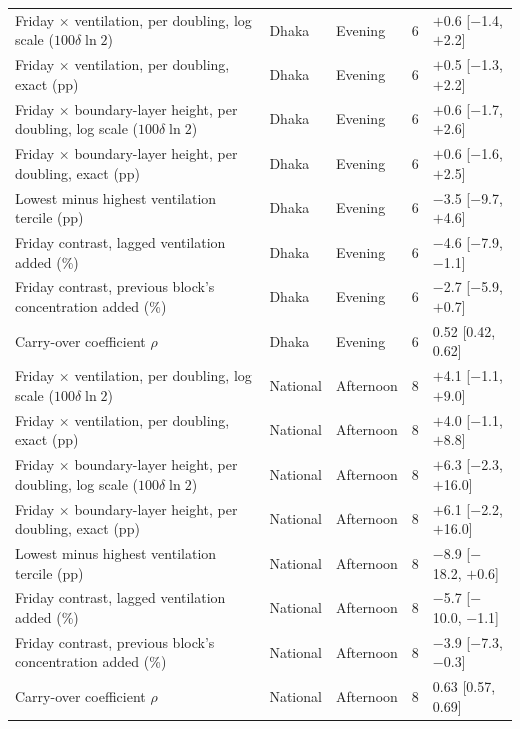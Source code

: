 \begin{longtable}{L{7.0cm} L{1.4cm} L{1.6cm} C{0.6cm} C{3.2cm}}
Friday $\times$ ventilation, per doubling, log scale ($100\delta\ln 2$) & Dhaka & Evening & 6 & $+$0.6 {\scriptsize[$-$1.4, $+$2.2]} \\
Friday $\times$ ventilation, per doubling, exact (pp) & Dhaka & Evening & 6 & $+$0.5 {\scriptsize[$-$1.3, $+$2.2]} \\
Friday $\times$ boundary-layer height, per doubling, log scale ($100\delta\ln 2$) & Dhaka & Evening & 6 & $+$0.6 {\scriptsize[$-$1.7, $+$2.6]} \\
Friday $\times$ boundary-layer height, per doubling, exact (pp) & Dhaka & Evening & 6 & $+$0.6 {\scriptsize[$-$1.6, $+$2.5]} \\
Lowest minus highest ventilation tercile (pp) & Dhaka & Evening & 6 & $-$3.5 {\scriptsize[$-$9.7, $+$4.6]} \\
Friday contrast, lagged ventilation added (\%) & Dhaka & Evening & 6 & $-$4.6 {\scriptsize[$-$7.9, $-$1.1]} \\
Friday contrast, previous block's concentration added (\%) & Dhaka & Evening & 6 & $-$2.7 {\scriptsize[$-$5.9, $+$0.7]} \\
Carry-over coefficient $\rho$ & Dhaka & Evening & 6 & 0.52 {\scriptsize[0.42, 0.62]} \\
Friday $\times$ ventilation, per doubling, log scale ($100\delta\ln 2$) & National & Afternoon & 8 & $+$4.1 {\scriptsize[$-$1.1, $+$9.0]} \\
Friday $\times$ ventilation, per doubling, exact (pp) & National & Afternoon & 8 & $+$4.0 {\scriptsize[$-$1.1, $+$8.8]} \\
Friday $\times$ boundary-layer height, per doubling, log scale ($100\delta\ln 2$) & National & Afternoon & 8 & $+$6.3 {\scriptsize[$-$2.3, $+$16.0]} \\
Friday $\times$ boundary-layer height, per doubling, exact (pp) & National & Afternoon & 8 & $+$6.1 {\scriptsize[$-$2.2, $+$16.0]} \\
Lowest minus highest ventilation tercile (pp) & National & Afternoon & 8 & $-$8.9 {\scriptsize[$-$18.2, $+$0.6]} \\
Friday contrast, lagged ventilation added (\%) & National & Afternoon & 8 & $-$5.7 {\scriptsize[$-$10.0, $-$1.1]} \\
Friday contrast, previous block's concentration added (\%) & National & Afternoon & 8 & $-$3.9 {\scriptsize[$-$7.3, $-$0.3]} \\
Carry-over coefficient $\rho$ & National & Afternoon & 8 & 0.63 {\scriptsize[0.57, 0.69]} \\

\end{longtable}
